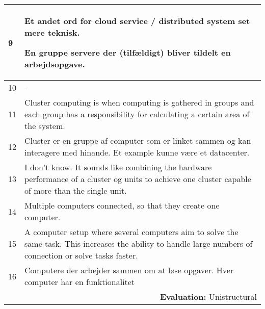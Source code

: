 \begin{longtable}{|p{0.3cm}|p{14.7cm}|}
9 & Et andet ord for cloud service / distributed system set mere teknisk. 

\noindent En gruppe servere der (tilfældigt) bliver tildelt en arbejdsopgave.   \\ \hline

10 & - \\ \hline

11 & Cluster computing is when computing is gathered in groups and each group has a responsibility for calculating a certain area of the system. \\ \hline

12 & Cluster er en gruppe af computer som er linket sammen og kan interagere med hinande. Et example kunne være et datacenter.\\ \hline

13 & I don't know. It sounds like combining the hardware performance of a cluster og units to achieve one cluster capable of more than the single unit. \\ \hline

14 & Multiple computers connected, so that they create one computer. \\ \hline

15 & A computer setup where several computers aim to solve the same task. This increases the ability to handle large numbers of connection or solve tasks faster. \\ \hline

16 & Computere der arbejder sammen om at løse opgaver. Hver computer har en funktionalitet \\ \hline

\multicolumn{2}{r}{\textbf{Evaluation:} Unistructural} \\ 

\end{longtable}
\normalsize


